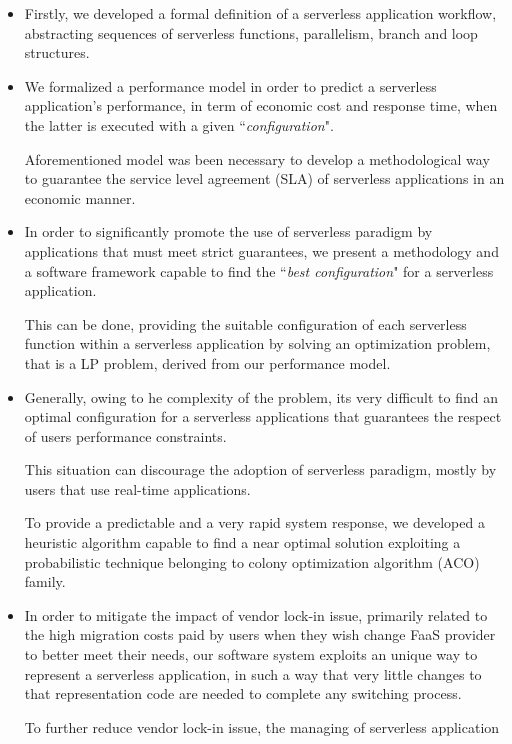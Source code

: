 \documentclass[12pt,a4paper]{report}
\theoremstyle{definition}
\begin{document}
\begin{itemize}
	\item Firstly, we developed a formal definition of a serverless application workflow, abstracting sequences of serverless functions, parallelism, branch and loop structures.
	
	\item We formalized a performance model in order to predict a serverless application's performance, in term of economic cost and response time, when the latter is executed with a given ``\textit{configuration}". 
	
	Aforementioned model was been necessary to develop a methodological way to guarantee the service level agreement (SLA) of serverless applications in an economic manner.
	
	\item In order to significantly promote the use of serverless paradigm by applications that must meet strict guarantees, we present a methodology and a software framework capable to find the ``\textit{best configuration}" for a serverless application.
	
	This can be done, providing the suitable configuration of each serverless function within a serverless application by solving an optimization
	problem, that is a LP problem, derived from our performance model.
	
	\item Generally, owing to he complexity of the problem, its very difficult to find an optimal configuration for a serverless applications that guarantees the respect of users performance constraints. 
	
	This situation can discourage the adoption of serverless paradigm, mostly by users that use real-time applications. 
	
	To provide a predictable and a very rapid system response, we developed a heuristic algorithm capable to find a near optimal solution exploiting a probabilistic technique belonging to colony optimization algorithm (ACO) family.  
	
	\item In order to mitigate the impact of vendor lock-in issue, primarily related to the high migration costs paid by users when they wish change FaaS provider to better meet their needs, our software system exploits an  unique way to represent a serverless application, in such a way that very little changes to that representation code are needed to complete any switching process.
	
	To further reduce vendor lock-in issue, the managing of serverless application 
	

\end{itemize}
\end{document}
